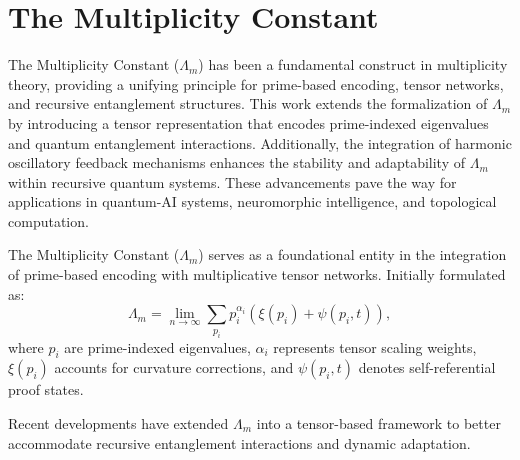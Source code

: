 \documentclass{article}
\theoremstyle{plain}
\begin{document}
\section{The Multiplicity Constant}
The Multiplicity Constant ($\Lambda_m$) has been a fundamental construct in multiplicity theory, providing a unifying principle for prime-based encoding, tensor networks, and recursive entanglement structures. This work extends the formalization of $\Lambda_m$ by introducing a tensor representation that encodes prime-indexed eigenvalues and quantum entanglement interactions. Additionally, the integration of harmonic oscillatory feedback mechanisms enhances the stability and adaptability of $\Lambda_m$ within recursive quantum systems. These advancements pave the way for applications in quantum-AI systems, neuromorphic intelligence, and topological computation.

The Multiplicity Constant ($\Lambda_m$) serves as a foundational entity in the integration of prime-based encoding with multiplicative tensor networks. Initially formulated as:
\begin{equation}
    \Lambda_m = \lim_{n\to\infty} \sum_{p_i} p_i^{\alpha_i} \left( \xi(p_i) + \psi(p_i, t) \right),
\end{equation}
where $p_i$ are prime-indexed eigenvalues, $\alpha_i$ represents tensor scaling weights, $\xi(p_i)$ accounts for curvature corrections, and $\psi(p_i, t)$ denotes self-referential proof states.

Recent developments have extended $\Lambda_m$ into a tensor-based framework to better accommodate recursive entanglement interactions and dynamic adaptation.
\nocite{*}


\end{document}
